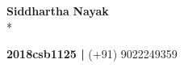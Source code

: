 \documentclass[letterpaper]{deedy-resume}
\begin{document}

\begin{flushleft}
\Huge \color{gray} \textbf{Siddhartha}  \Huge \textbf{Nayak}\\*
\begin{small}
\color{darkgray} \textbf{2018csb1125 |} \color{gray} (+91) 9022249359 \\
\end{small}
\end{flushleft}

\end{document}
